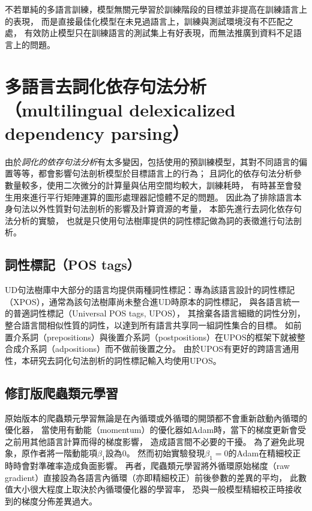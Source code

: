 不若單純的多語言訓練，模型無關元學習於訓練階段的目標並非提高在訓練語言上的表現，
而是直接最佳化模型在未見過語言上，訓練與測試環境沒有不匹配之處，
有效防止模型只在訓練語言的測試集上有好表現，而無法推廣到資料不足語言上的問題。

\iffalse
尤其當目標任務缺乏資料的時候，若使用過於有表現力的假說集合，
易使模型過擬合到目標任務上，
利用相似任務進行多工學習幫助目標任務提升表現的效果尤其顯著。
然而多工學習得到的模型可以在訓練過的所有任務上的測試集有好表現，
但並未保證這樣的好表現可以轉移到相似但未見過的任務上；
而芬氏(Chelsea Finn)提出的模型無關元學習(model-agnostic meta-learning)
\cite{Finn2017ModelAgnosticMF}提供了多工學習之外的另一種方法，
將領域的歸納偏置（inductive bias）注入類神經網路中。
\fi



\section{多語言去詞化依存句法分析（multilingual delexicalized dependency parsing）}
由於\textit{詞化的依存句法分析}有太多變因，包括使用的預訓練模型，其對不同語言的偏置等等，都會影響句法剖析模型於目標語言上的行為；
且詞化的依存句法分析參數量較多，使用二次微分的計算量與佔用空間均較大，訓練耗時，
有時甚至會發生用來進行平行矩陣運算的圖形處理器記憶體不足的問題。
因此為了排除語言本身句法以外性質對句法剖析的影響及計算資源的考量，
本節先進行去詞化依存句法分析的實驗，
也就是只使用句法樹庫提供的詞性標記做為詞的表徵進行句法剖析。

\subsection{詞性標記（POS tags）}
UD句法樹庫中大部分的語言均提供兩種詞性標記：專為該語言設計的詞性標記（XPOS），通常為該句法樹庫尚未整合進UD時原本的詞性標記，
與各語言統一的普適詞性標記\cite{petrov-etal-2012-universal}（Universal POS tags, UPOS），
其捨棄各語言細緻的詞性分別，
整合語言間相似性質的詞性，以達到所有語言共享同一組詞性集合的目標。
如前置介系詞（prepositions）與後置介系詞（postpositions）在UPOS的框架下就被整合成介系詞（adpositions）而不做前後置之分。
由於UPOS有更好的跨語言通用性，本研究去詞化句法剖析的詞性標記輸入均使用UPOS。

\subsection{修訂版爬蟲類元學習}
原始版本的爬蟲類元學習\cite{nichol2018first}無論是在內循環或外循環的開頭都不會重新啟動內循環的優化器，
當使用有動能（momentum）的優化器如Adam時，當下的梯度更新會受之前用其他語言計算而得的梯度影響，
造成語言間不必要的干擾。
為了避免此現象，原作者將一階動能項$\beta_{1}$設為$0$。
然而初始實驗發現$\beta_{1} = 0$的Adam在精細校正時時會對準確率造成負面影響。
再者，爬蟲類元學習將外循環原始梯度（raw gradient）直接設為各語言內循環（亦即精細校正）前後參數的差異的平均，
此數值大小很大程度上取決於內循環優化器的學習率，
恐與一般模型精細校正時接收到的梯度分佈差異過大。


